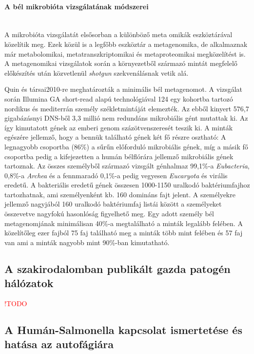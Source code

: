 \documentclass[a4paper,12pt]{article}
\begin{document}
		\paragraph{A bél mikrobióta vizsgálatának módszerei} \mbox{}\\
		A mikrobióta vizsgálatát elsősorban a különböző meta omikák eszköztárával közelítik meg. Ezek közül is a legfőbb eszköztár a metagenomika, de alkalmaznak már metabolomikai, metatranszkriptomikai és metaproteomikai megközelítést is. A metagenomikai vizsgálatok során a környezetből származó mintát megfelelő előkészítés után közvetlenül \textit{shotgun} szekvenálásnak vetik alá.\cite{gut_microbiome} 
		
		Quin és társai2010-re meghatározták a minimális bél metagenomot. A vizsgálat során Illumina GA short-read alapú technológiával 124 egy kohortba tartozó nordikus és mediterrán személy székletmintáját elemezték. Az ebből kinyert 576,7 gigabázásnyi DNS-ből 3,3 millió nem redundáns mikrobiális gént mutattak ki. Az így kimutatott gének az emberi genom százötvenszeresét teszik ki. A minták egészére jellemző, hogy a bennük található gének két fő részre osztható: A legnagyobb csoportba (86\%) a sűrűn előforduló mikrobiális gének, míg a másik fő csoportba pedig a kifejezetten a humán bélflórára jellemző mikrobiális gének tartoznak. Az összes személyből származó vizsgált génhalmaz 99,1\%-a \textit{Eubacteria}, 0,8\%-a \textit{Archea} és a fennmaradó 0,1\%-a pedig vegyesen \textit{Eucaryota} és virális eredetű. A bakteriális eredetű gének összesen 1000-1150 uralkodó baktériumfajhoz tartozhatnak, ami személyenként kb. 160 domináns fajt jelent. A személyekre jellemző nagyjából 160 uralkodó baktériumfaj listái között a személyeket összevetve nagyfokú hasonlóság figyelhető meg. Egy adott személy bél metagenomjának minimálisan 40\%-a megtalálható a minták legalább felében. A közelítőleg ezer fajból 75 faj található meg a minták több mint felében és 57 faj van ami a minták nagyobb mint 90\%-ban kimutatható.  \cite{meta_omics}
		
	\subsection{A szakirodalomban publikált gazda patogén hálózatok}
	\textcolor{red}{ !TODO} 
	
	\subsection{A Humán-Salmonella kapcsolat ismertetése és hatása az autofágiára}
	
\end{document}
